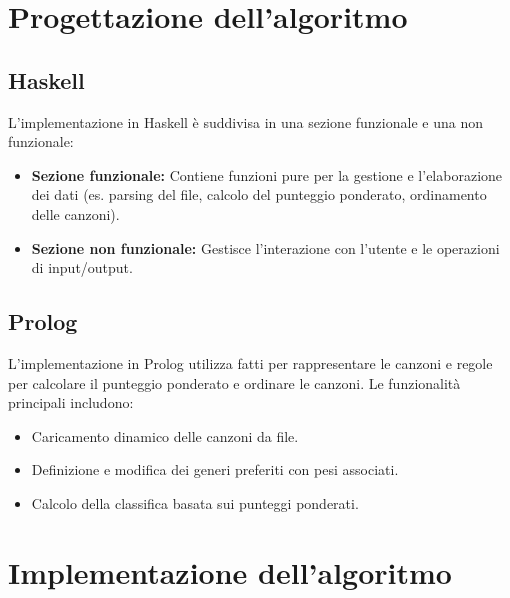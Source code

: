 \documentclass[a4paper,11pt]{article}
\begin{document}
\section{Progettazione dell'algoritmo}
\subsection{Haskell}
L'implementazione in Haskell è suddivisa in una sezione funzionale e una non funzionale:
\begin{itemize}
    \item \textbf{Sezione funzionale:} Contiene funzioni pure per la gestione e l'elaborazione dei dati (es. parsing del file, calcolo del punteggio ponderato, ordinamento delle canzoni).
    \item \textbf{Sezione non funzionale:} Gestisce l'interazione con l'utente e le operazioni di input/output.
\end{itemize}

\subsection{Prolog}
L'implementazione in Prolog utilizza fatti per rappresentare le canzoni e regole per calcolare il punteggio ponderato e ordinare le canzoni. Le funzionalità principali includono:
\begin{itemize}
    \item Caricamento dinamico delle canzoni da file.
    \item Definizione e modifica dei generi preferiti con pesi associati.
    \item Calcolo della classifica basata sui punteggi ponderati.
\end{itemize}

\section{Implementazione dell'algoritmo}
\end{document}
